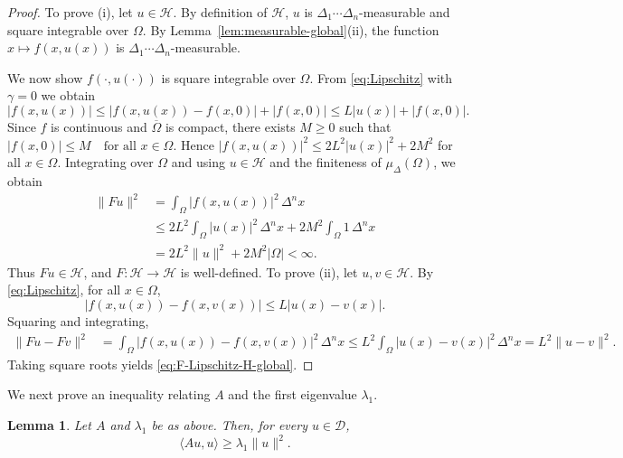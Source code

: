 \documentclass{article}
\newtheorem{lemma}[theorem]{Lemma}
\numberwithin{equation}{section}
\numberwithin{theorem}{section}
\begin{document}
\begin{proof}
To prove (i), let $u\in \mathscr{H}$. By definition of $\mathscr{H}$, $u$ is $\Delta_1\cdots\Delta_n$-measurable and square integrable over $\Omega$. By Lemma~\ref{lem:measurable-global}(ii), the function $x\mapsto f(x,u(x))$ is $\Delta_1\cdots\Delta_n$-measurable.

We now show $f(\cdot,u(\cdot))$ is square integrable over $\Omega$. From \eqref{eq:Lipschitz} with $\gamma=0$ we obtain
\[
|f(x,u(x))|
\le |f(x,u(x)) - f(x,0)| + |f(x,0)|
\le L |u(x)| + |f(x,0)|.
\]
Since $f$ is continuous and $\overline{\Omega}$ is compact, there exists $M\ge 0$ such that
$|f(x,0)| \le M \quad \text{for all } x\in\Omega.$
Hence
$|f(x,u(x))|^2 \le 2L^2 |u(x)|^2 + 2M^2$
for all $x\in\Omega$. Integrating over $\Omega$ and using $u\in \mathscr{H}$ and the finiteness of $\mu_\Delta(\Omega)$, we obtain
\begin{align*}
\|Fu\|^2
&= \int_{\Omega} |f(x,u(x))|^2\,\Delta^n x\\
&\le 2L^2 \int_{\Omega} |u(x)|^2\,\Delta^n x + 2M^2 \int_{\Omega} 1\,\Delta^n x\\
&= 2L^2 \|u\|^2 + 2M^2 |\Omega| < \infty.
\end{align*}
Thus $Fu\in \mathscr{H}$, and $F\colon\mathscr{H}\to \mathscr{H}$ is well-defined. To prove (ii), let $u,v\in \mathscr{H}$. By \eqref{eq:Lipschitz}, for all $x\in\Omega$,
\[
|f(x,u(x)) - f(x,v(x))| \le L |u(x)-v(x)|.
\]
Squaring and integrating,
\begin{align*}
\|Fu - Fv\|^2
&= \int_{\Omega} |f(x,u(x)) - f(x,v(x))|^2\,\Delta^n x \le L^2 \int_{\Omega} |u(x)-v(x)|^2\,\Delta^n x = L^2 \|u-v\|^2.
\end{align*}
Taking square roots yields \eqref{eq:F-Lipschitz-H-global}.
\end{proof}
We next prove an inequality relating $A$ and the first eigenvalue $\lambda_1$.
\begin{lemma}\label{lem:spectral-ineq}
Let $A$ and $\lambda_1$ be as above. Then, for every $u\in \mathscr{D}$,
\begin{equation}\label{eq:spectral-ineq}
\langle Au,u\rangle \ge \lambda_1 \|u\|^2.
\end{equation}
\end{lemma}
\end{document}
